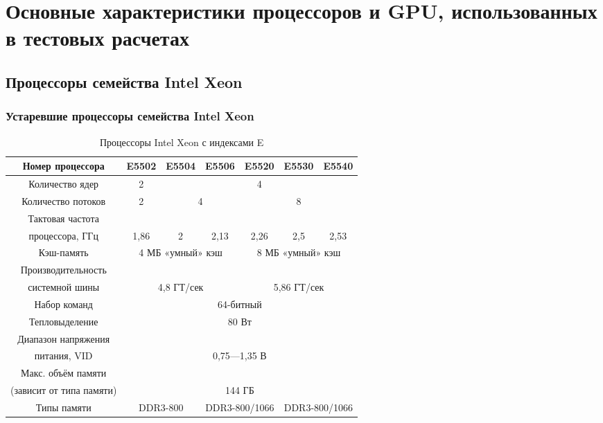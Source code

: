 \chapter{Основные характеристики процессоров и GPU, использованных в тестовых расчетах} \label{AppendixA}

\section{Процессоры семейства Intel Xeon}
\subsection{Устаревшие процессоры семейства Intel Xeon}

\begin{center}
\begin{table}[ht]
\caption{Процессоры Intel Xeon с индексами E}
	\begin{tabular}{|c|c|c|c|c|c|c|}
		\hline
		Номер процессора & E5502 & E5504 & E5506 & E5520 & E5530 & E5540 \\ \hline
		Количество ядер  & 2 & \multicolumn{5}{c|}{4} \\ \hline
		Количество потоков & 2 & \multicolumn{2}{c|}{4} & \multicolumn{3}{c|}{8} \\ \hline
		Тактовая частота   &          &       &          &          &          &  \\
		процессора, ГГц    & 1,86  & 2  & 2,13 & 2,26 & 2,5 & 2,53 \\ \hline
		Кэш-память         & \multicolumn{3}{c|}{4 МБ «умный» кэш} & \multicolumn{3}{c|}{8 МБ «умный» кэш} \\ \hline
		Производительность &  \multicolumn{3}{c|}{}          & \multicolumn{3}{c|}{} \\   
		системной шины     & \multicolumn{3}{c|}{4,8 ГТ/сек} & \multicolumn{3}{c|}{5,86 ГТ/сек} \\ \hline
		Набор команд       &\multicolumn{6}{c|}{64-битный} \\ \hline
		Тепловыделение     & \multicolumn{6}{c|}{80 Вт} \\ \hline
		Диапазон напряжения & \multicolumn{6}{c|}{}  \\
		питания, VID        & \multicolumn{6}{c|}{0,75—1,35 В} \\ \hline
		Макс. объём памяти  & \multicolumn{6}{c|}{}  \\
		(зависит от типа памяти) & \multicolumn{6}{c|}{144 ГБ} \\ \hline
		Типы памяти & \multicolumn{2}{c|}{DDR3-800} & \multicolumn{2}{c|}{DDR3-800/1066} & \multicolumn{2}{c|}{DDR3-800/1066} \\ \hline

\end{tabular}
\end{table}
\end{center}
